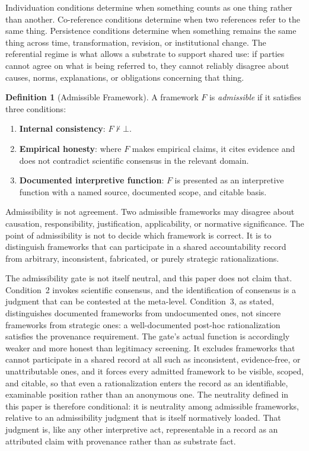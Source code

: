 \documentclass[11pt]{article}
\theoremstyle{plain}
\theoremstyle{definition}
\newtheorem{definition}[theorem]{Definition}
\theoremstyle{remark}
\newcommand{\Framework}{F}
\newcommand{\notentails}{\nvdash}
\begin{document}
Individuation conditions determine when something counts as one thing rather
than another. Co-reference conditions determine when two references refer to
the same thing. Persistence conditions determine when something remains the
same thing across time, transformation, revision, or institutional change. The
referential regime is what allows a substrate to support shared use: if parties
cannot agree on what is being referred to, they cannot reliably disagree about
causes, norms, explanations, or obligations concerning that thing.

\begin{definition}[Admissible Framework]
  \label{se100.def.AdmissibleFramework}
  A framework $\Framework$ is \emph{admissible} if it satisfies three conditions:
  \begin{enumerate}
    \item \textbf{Internal consistency}: $\Framework \notentails \bot$.
    \item \textbf{Empirical honesty}: where $\Framework$ makes empirical claims,
          it cites evidence and does not contradict scientific consensus in the
          relevant domain.
    \item \textbf{Documented interpretive function}: $\Framework$ is presented as
          an interpretive function with a
          named source, documented scope, and citable basis.
  \end{enumerate}
\end{definition}

Admissibility is not agreement.
Two admissible frameworks may disagree about
causation, responsibility, justification, applicability, or normative
significance.
The point of admissibility is not to decide which framework is
correct.
It is to distinguish frameworks that can participate in a shared
accountability record
from arbitrary, inconsistent, fabricated, or purely
strategic rationalizations.

The admissibility gate is not itself neutral,
and this paper does not claim that.
Condition~2 invokes scientific consensus,
and the identification of consensus is a judgment
that can be contested at the meta-level.
Condition~3, as stated, distinguishes documented frameworks from undocumented ones,
not sincere frameworks from strategic ones:
a well-documented post-hoc rationalization satisfies the provenance requirement.
The gate's actual
function is accordingly weaker and more honest than legitimacy screening.
It excludes frameworks that cannot participate in a shared record at all such as
inconsistent, evidence-free, or unattributable ones, and it forces every
admitted framework to be visible, scoped, and citable,
so that even a rationalization enters the record as an
identifiable, examinable position rather than an anonymous one.
The neutrality defined in this paper is therefore conditional:
it is neutrality among admissible frameworks,
relative to an
admissibility judgment that is itself normatively loaded.
That judgment is,
like any other interpretive act,
representable in a record as an attributed
claim with provenance rather than as substrate fact.
\end{document}
